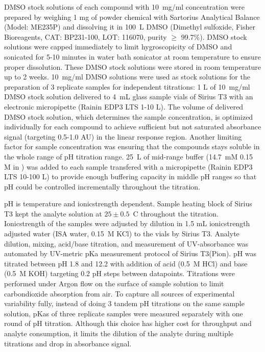\documentclass[9pt,lineno]{elife}
\begin{document}
DMSO stock solutions of each compound with 10~mg/ml concentration were prepared by weighing 1 mg of powder chemical with Sartorius Analytical Balance (Model: ME235P) and dissolving it in 100~\micro L DMSO (Dimethyl sulfoxide, Fisher Bioreagents, CAT: BP231-100, LOT: 116070, purity $\geq$ 99.7\%).  DMSO stock solutions were capped immediately to limit hygroscopicity of DMSO and sonicated for 5-10 minutes in water bath sonicator at room temperature to ensure proper dissolution. These DMSO stock solutions were stored in room temperature up to 2 weeks. 10~mg/ml DMSO solutions were used as stock solutions for the preparation of 3 replicate samples for independent titrations:  1 \micro L of 10~mg/ml DMSO stock solution delivered to 4~mL glass sample vials of Sirius T3 with an electronic micropipette (Rainin EDP3 LTS 1-10 \micro L). The volume of delivered DMSO stock solution, which determines the sample concentration, is optimized individually for each compound to achieve sufficient but not saturated absorbance signal (targeting 0.5-1.0 AU) in the linear response region. Another limiting factor for sample concentration was ensuring that the compounds stays soluble in the whole range of pH titration range. 25~\micro L of mid-range buffer (14.7~mM  0.15 M  in ) was added to each sample transfered with a micropipette (Rainin EDP3 LTS 10-100 \micro L) to provide enough buffering capacity in middle pH ranges so that pH could be controlled incrementally throughout the titration.  

pH is temperature and ionic\textendash strength dependent. Sample heating block of Sirius T3 kept the analyte solution at $25 \pm 0.5$~\textdegree C throughout the titration. Ionic\textendash strength of the samples were adjusted by dilution in 1.5 mL ionic\textendash strength adjusted water (ISA water, 0.15~M KCl) to the vials by Sirius T3.  Analyte dilution, mixing, acid/base titration, and measurement of UV-absorbance was automated by UV-metric pKa measurement protocol of Sirius T3(Pion). pH was titrated between pH 1.8 and 12.2 with addition of acid (0.5~M HCl) and base (0.5~M KOH) targeting 0.2 pH steps between datapoints. Titrations were performed under Argon flow on the surface of sample solution to limit carbondioxide absorption from air. To capture all sources of experimental variability fully, instead of doing 3 tandem pH titrations on the same sample solution, pKas of three replicate samples were measured separately with one round of pH titration. Although this choice has higher cost for throughput and analyte consumption, it limits the dilution of the analyte during multiple titrations and drop in absorbance signal. 
\end{document}
